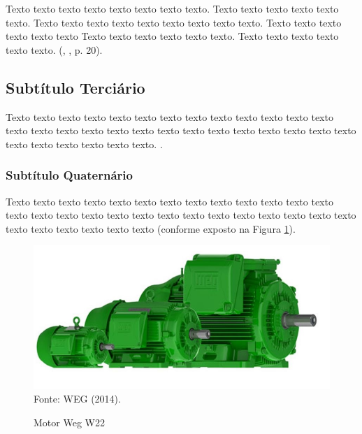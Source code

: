  \begin{citacao}
            \begin{alineas}[leftmargin=\leftskip+\labelwidth-\labelsep]
                Texto texto texto texto texto texto texto texto. Texto texto texto texto texto texto. Texto texto texto texto texto texto texto texto texto. Texto texto texto texto texto texto Texto texto texto texto texto texto. Texto texto texto texto texto texto. (\citeauthor{ref:ibmm}, \citeyear{ref:ibmm}, p. 20).
            \end{alineas}
\end{citacao}



\subsection{Subtítulo Terciário}

Texto texto texto texto texto texto texto texto texto texto texto texto texto texto texto texto texto texto texto texto texto texto texto texto texto texto texto texto texto texto texto texto texto. \cite{ref:mulligan}.


\subsubsection{Subtítulo Quaternário}

Texto texto texto texto texto texto texto texto texto texto texto texto texto texto texto texto texto texto texto texto texto texto texto texto texto texto texto texto texto texto texto texto texto  (conforme exposto na Figura \ref{fig:motor}).



    \begin{figure}[H]
    	\centering
    	\caption{Motor Weg W22}
    	\includegraphics[scale=0.45]{figuras/motor.jpg}
    	\label{fig:motor}
    	\\
        \vspace{-0.8cm}\hspace{-7cm}\small{Fonte: WEG (2014).} 
    \end{figure}
    
